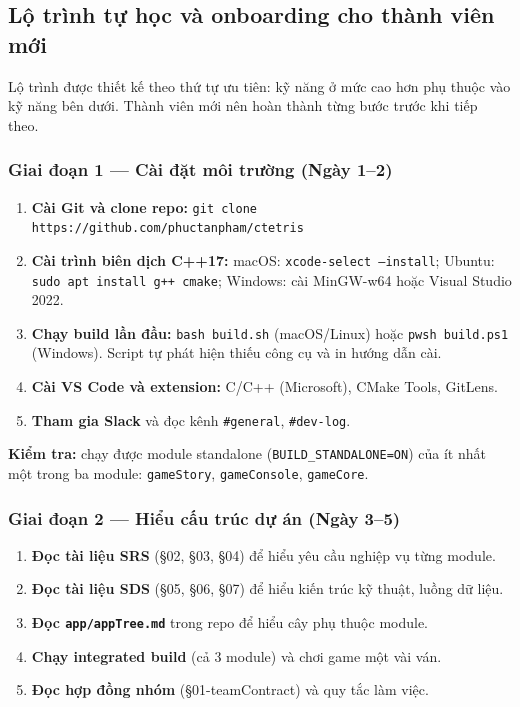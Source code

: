 \documentclass[12pt,a4paper]{article}
\begin{document}
\subsection{Lộ trình tự học và onboarding cho thành viên mới}

Lộ trình được thiết kế theo thứ tự ưu tiên: kỹ năng ở mức cao hơn phụ thuộc vào
kỹ năng bên dưới. Thành viên mới nên hoàn thành từng bước trước khi tiếp theo.

\subsubsection{Giai đoạn 1 --- Cài đặt môi trường (Ngày 1--2)}

\begin{enumerate}[nosep]
    \item \textbf{Cài Git và clone repo:}
          \texttt{git clone https://github.com/phuctanpham/ctetris}
    \item \textbf{Cài trình biên dịch C++17:}
          macOS: \texttt{xcode-select --install};
          Ubuntu: \texttt{sudo apt install g++ cmake};
          Windows: cài MinGW-w64 hoặc Visual Studio 2022.
    \item \textbf{Chạy build lần đầu:}
          \texttt{bash build.sh} (macOS/Linux) hoặc \texttt{pwsh build.ps1} (Windows).
          Script tự phát hiện thiếu công cụ và in hướng dẫn cài.
    \item \textbf{Cài VS Code và extension:} C/C++ (Microsoft), CMake Tools, GitLens.
    \item \textbf{Tham gia Slack} và đọc kênh \texttt{\#general}, \texttt{\#dev-log}.
\end{enumerate}

\textbf{Kiểm tra:} chạy được module standalone (\texttt{BUILD\_STANDALONE=ON}) của
ít nhất một trong ba module: \texttt{gameStory}, \texttt{gameConsole}, \texttt{gameCore}.

\subsubsection{Giai đoạn 2 --- Hiểu cấu trúc dự án (Ngày 3--5)}

\begin{enumerate}[nosep]
    \item \textbf{Đọc tài liệu SRS} (§02, §03, §04) để hiểu yêu cầu nghiệp vụ từng module.
    \item \textbf{Đọc tài liệu SDS} (§05, §06, §07) để hiểu kiến trúc kỹ thuật, luồng dữ liệu.
    \item \textbf{Đọc \texttt{app/appTree.md}} trong repo để hiểu cây phụ thuộc module.
    \item \textbf{Chạy integrated build} (cả 3 module) và chơi game một vài ván.
    \item \textbf{Đọc hợp đồng nhóm} (§01-teamContract) và quy tắc làm việc.
\end{enumerate}
\end{document}
